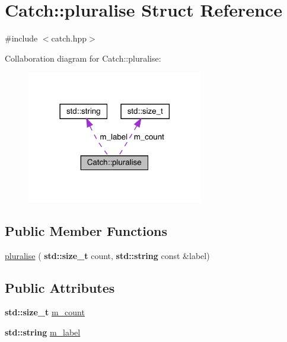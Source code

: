 \hypertarget{struct_catch_1_1pluralise}{}\section{Catch\+:\+:pluralise Struct Reference}
\label{struct_catch_1_1pluralise}


{\ttfamily \#include $<$catch.\+hpp$>$}



Collaboration diagram for Catch\+:\+:pluralise\+:
\nopagebreak
\begin{figure}[H]
\begin{center}
\leavevmode
\includegraphics[width=218pt]{struct_catch_1_1pluralise__coll__graph}
\end{center}
\end{figure}
\subsection*{Public Member Functions}
\begin{DoxyCompactItemize}
\item 
\hyperlink{struct_catch_1_1pluralise_a5c55e22de2416cfe416edf715c6b9234}{pluralise} (\textbf{ std\+::size\+\_\+t} count, \textbf{ std\+::string} const \&label)
\end{DoxyCompactItemize}
\subsection*{Public Attributes}
\begin{DoxyCompactItemize}
\item 
\textbf{ std\+::size\+\_\+t} \hyperlink{struct_catch_1_1pluralise_a4dce2fa13ec6f00fac09b2418265441e}{m\+\_\+count}
\item 
\textbf{ std\+::string} \hyperlink{struct_catch_1_1pluralise_a8849cbdd3f11ebe7747597c8644e8793}{m\+\_\+label}
\end{DoxyCompactItemize}
